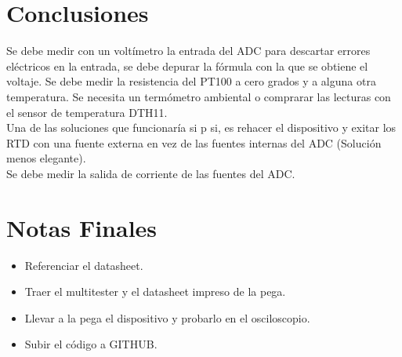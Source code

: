 \documentclass{article}
\begin{document}
\section{Conclusiones}
Se debe medir con un voltímetro la entrada del ADC para descartar errores eléctricos en la entrada, se debe depurar la fórmula con la que se obtiene el voltaje. Se debe medir la resistencia del PT100 a cero grados y a alguna otra temperatura. Se necesita un termómetro ambiental o comprarar las lecturas con el sensor de temperatura DTH11.\\
Una de las soluciones que funcionaría si p si, es rehacer el dispositivo y exitar los RTD con una fuente externa en vez de las fuentes internas del ADC (Solución menos elegante).\\
Se debe medir la salida de corriente de las fuentes del ADC.

\section{Notas Finales}
\begin{itemize}
\item Referenciar el datasheet.
\item Traer el multitester y el datasheet impreso de la pega.
\item Llevar a la pega el dispositivo y probarlo en el osciloscopio.
  \item Subir el código a GITHUB.
  \end{itemize}




\end{document}
